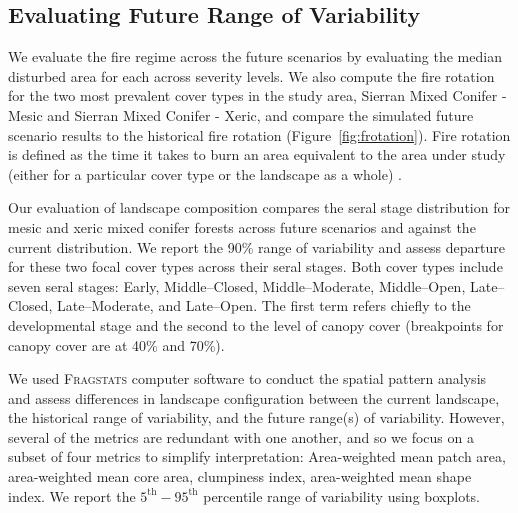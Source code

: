 \subsection*{Evaluating Future Range of Variability}
We evaluate the fire regime across the future scenarios by evaluating the median disturbed area for each across severity levels. %
We also compute the fire rotation for the two most prevalent cover types in the study area, Sierran Mixed Conifer - Mesic and Sierran Mixed Conifer - Xeric, and compare the simulated future scenario results to the historical fire rotation (Figure~\ref{fig:frotation}). Fire rotation is defined as the time it takes to burn an area equivalent to the area under study (either for a particular cover type or the landscape as a whole) \citep{Agee1993}.%
%


Our evaluation of landscape composition compares the seral stage distribution for mesic and xeric mixed conifer forests across future scenarios and against the current distribution. We report the 90\% range of variability and assess departure for these two focal cover types across their seral stages. Both cover types include seven seral stages: Early, Middle--Closed, Middle--Moderate, Middle--Open, Late--Closed, Late--Moderate, and Late--Open. The first term refers chiefly to the developmental stage and the second to the level of canopy cover (breakpoints for canopy cover are at 40\% and 70\%).


%
We used \textsc{Fragstats} computer software \citep{Fragstats2012} to conduct the spatial pattern analysis and assess differences in landscape configuration between the current landscape, the historical range of variability, and the future range(s) of variability. However, several of the metrics are redundant with one another, and so we focus on a subset of four metrics to simplify interpretation: Area-weighted mean patch area, area-weighted mean core area, clumpiness index, area-weighted mean shape index. We report the $5^{\text{th}}-95^{\text{th}}$ percentile range of variability using boxplots. %

